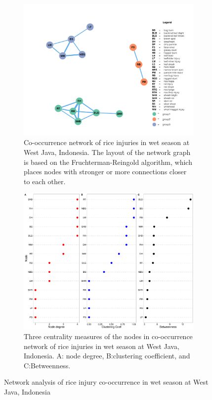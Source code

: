 \begin{figure}
    \centering
    \begin{subfigure}[b]{1\textwidth}
        \includegraphics[width = 1\textwidth]{figures/networkWJ_ws/networkWJ_ws.pdf}
        \caption{Co-occurrence network of rice injuries in wet season at West Java, Indonesia. The layout of the network graph is based on the Fruchterman-Reingold algorithm, which places nodes with stronger or more connections closer to each other.}
        \label{fig:networkWJ_ws}
    \end{subfigure}
    \begin{subfigure}[b]{1\textwidth}
        \includegraphics[width = 1\textwidth]{figures/nodepropWJ_ws/nodepropWJ_ws.pdf}
        \caption{Three centrality measures of the nodes in co-occurrence network of rice injuries in wet season at West Java, Indonesia. A: node degree, B:clustering coefficient, and C:Betweenness.}
        \label{fig:nodepropWJ_ds}    \end{subfigure}    
\caption{Network analysis of rice injury co-occurrence in wet season at West Java, Indonesia}
    \label{fig:WJ_ws}
    \end{figure}


